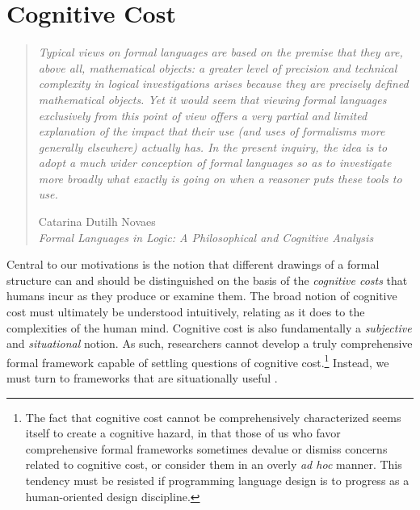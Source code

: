 
\section{Cognitive Cost}\label{sec:syntactic-properties}
\begin{quote}
\emph{Typical views on formal languages are based on the premise that they are,
above all, mathematical objects: a greater level of precision and technical
complexity in logical investigations arises because they are precisely defined
mathematical objects. Yet it would seem that viewing formal languages
exclusively from this point of view offers a very partial and limited explanation
of the impact that their use (and uses of formalisms more generally
elsewhere) actually has. In the present inquiry, the idea is to adopt a much
wider conception of formal languages so as to investigate more broadly what
exactly is going on when a reasoner puts these tools to use.}

\begin{flushright}Catarina Dutilh Novaes\\
\emph{Formal Languages in Logic: A Philosophical and Cognitive Analysis} \cite{novaes2012formal}
\end{flushright}
\end{quote}

Central to our motivations is the notion that different drawings of a formal structure can and should be distinguished on the basis of the  \emph{cognitive costs} that humans incur as they produce or examine them. The broad notion of cognitive cost must ultimately be understood intuitively, relating as it does to the complexities of the human mind. Cognitive cost is also fundamentally a \emph{subjective} and \emph{situational} notion. 
As such, researchers cannot develop a truly comprehensive formal framework capable of settling questions of cognitive cost.\footnote{The fact that cognitive cost cannot be comprehensively characterized seems itself to create a cognitive hazard, in that those of us who favor comprehensive formal frameworks sometimes devalue or dismiss concerns related to cognitive cost, or consider them in an overly \emph{ad hoc} manner. This tendency must be resisted if programming language design is to progress as a human-oriented design discipline.} Instead, we must turn to frameworks that are situationally useful \cite{box1987empirical}. %

